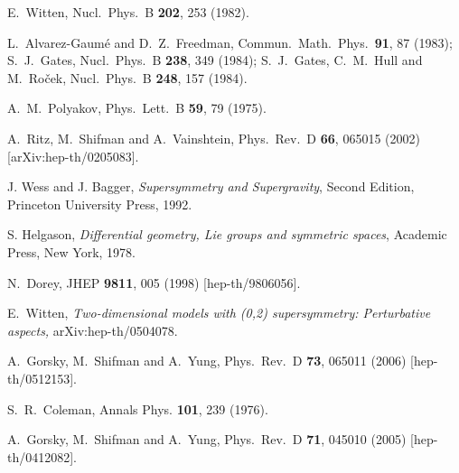 \documentclass[epsfig,12pt]{article}
\newcommand{\cpn}{CP$^{N-1}$\,}
\begin{document}
\begin{thebibliography}{99}
  E.~Witten,
  Nucl.\ Phys.\  B {\bf 202}, 253 (1982).
  
  L.~Alvarez-Gaum\'{e} and D.~Z.~Freedman,
  Commun.\ Math.\ Phys.\  {\bf 91}, 87 (1983);
  S.~J.~Gates,
  Nucl.\ Phys.\ B {\bf 238}, 349 (1984);
  S.~J.~Gates, C.~M.~Hull and M.~Ro\v{c}ek,
  Nucl.\ Phys.\ B {\bf 248}, 157 (1984).

  A.~M.~Polyakov,
  Phys.\ Lett.\  B {\bf 59}, 79 (1975).
  
  A.~Ritz, M.~Shifman and A.~Vainshtein,
  Phys.\ Rev.\  D {\bf 66}, 065015 (2002)
  [arXiv:hep-th/0205083].
  
  J. Wess and J. Bagger, {\em Supersymmetry and Supergravity}, Second Edition,
  Princeton University Press, 1992.

  S. Helgason, {\sl Differential geometry, Lie groups and symmetric spaces},
  Academic Press, New York, 1978.
  
  N.~Dorey,
  JHEP {\bf 9811}, 005 (1998) [hep-th/9806056].

  E.~Witten,
  {\em Two-dimensional models with (0,2) supersymmetry: Perturbative aspects,}
  arXiv:hep-th/0504078.
  
  A.~Gorsky, M.~Shifman and A.~Yung,
  Phys.\ Rev.\ D {\bf 73}, 065011 (2006)
  [hep-th/0512153].

  S.~R.~Coleman,
  Annals Phys.  {\bf 101}, 239 (1976).

  A.~Gorsky, M.~Shifman and A.~Yung,
  Phys.\ Rev.\ D {\bf 71}, 045010 (2005)
  [hep-th/0412082].


\end{thebibliography}
\end{document}
